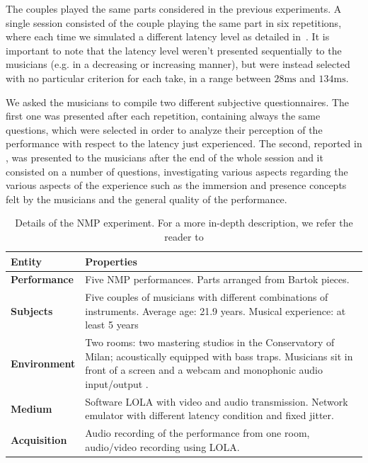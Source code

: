 The couples played the same parts considered in the previous experiments. A single session consisted of the couple playing the same part in six repetitions, where each time we simulated a different latency level as detailed in~\cite{CIM2018}. It is important to note that the latency level weren't presented sequentially to the musicians (e.g. in a decreasing or increasing manner), but were instead selected with no particular criterion for each take, in a range between $28\mathrm{ms}$ and $134\mathrm{ms}$.

We asked the musicians to compile two different subjective questionnaires. The first one was presented  after each repetition, containing always the same questions, which were selected in order to analyze their perception of the performance with respect to the latency just experienced. The second, reported in \cite{CIM2018}, was presented to the musicians after the end of the whole session and it consisted on a number of questions, investigating various aspects regarding the various aspects of the experience such as the immersion and presence concepts felt by the musicians and the general quality of the performance.












\begin{table}
	\centering
	\caption{Details of the NMP experiment. For a more in-depth description, we refer the reader to \cite{CIM2018} }
	\begin{tabular}{p{1.5cm}p{6cm}}
		\hline
		\textbf{Entity} & \textbf{Properties} \\
		\hline
		\textbf{Performance} & Five NMP performances. \newline  Parts arranged from Bartok pieces. \\
		\textbf{Subjects} & Five couples of musicians with different combinations of instruments. Average age: 21.9 years. Musical experience: at least 5 years\\
		\textbf{Environment} & Two rooms: two mastering studios in the Conservatory of Milan; acoustically equipped with bass traps. Musicians sit in front of a screen and a webcam and monophonic audio input/output .\\
		\textbf{Medium} & Software LOLA with video and audio transmission. Network emulator with different latency condition and fixed jitter. \\
		\textbf{Acquisition} & Audio recording of the performance from one room, audio/video recording using LOLA.\\
		\hline
	\end{tabular}
	\label{tab:exp2}
\end{table}


